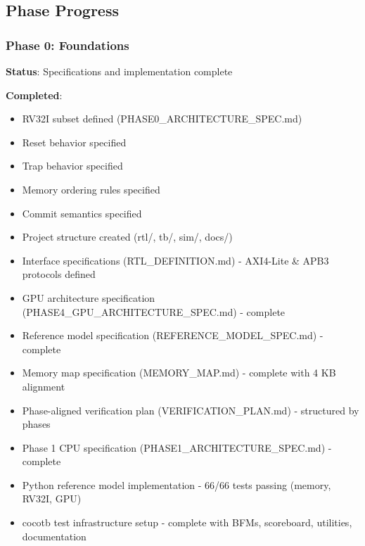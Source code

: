 \subsection{Phase Progress}\label{cr:status:phase-status:phase-progress}

\subsubsection{\texorpdfstring{Phase 0: Foundations
\ok{}}{Phase 0: Foundations }}\label{cr:status:phase-status:phase-0-foundations-white-check-mark}

\begin{record}

\textbf{Status}: Specifications and implementation complete

\textbf{Completed}:

\begin{itemize}
\tightlist
\item
  \ok{} RV32I subset defined
  (PHASE0\_\allowbreak{}ARCHITECTURE\_\allowbreak{}SPEC.md)
\item
  \ok{} Reset behavior specified
\item
  \ok{} Trap behavior specified
\item
  \ok{} Memory ordering rules specified
\item
  \ok{} Commit semantics specified
\item
  \ok{} Project structure created (rtl/, tb/, sim/, docs/)
\item
  \ok{} Interface specifications (RTL\_\allowbreak{}DEFINITION.md) -
  AXI4-Lite \& APB3 protocols defined
\item
  \ok{} GPU architecture specification
  (PHASE4\_\allowbreak{}GPU\_\allowbreak{}ARCHITECTURE\_\allowbreak{}SPEC.md)
  - complete
\item
  \ok{} Reference model specification
  (REFERENCE\_\allowbreak{}MODEL\_\allowbreak{}SPEC.md) - complete
\item
  \ok{} Memory map specification (MEMORY\_\allowbreak{}MAP.md) -
  complete with 4 KB alignment
\item
  \ok{} Phase-aligned verification plan
  (VERIFICATION\_\allowbreak{}PLAN.md) - structured by phases
\item
  \ok{} Phase 1 CPU specification
  (PHASE1\_\allowbreak{}ARCHITECTURE\_\allowbreak{}SPEC.md) - complete
\item
  \ok{} Python reference model implementation - 66/66 tests passing
  (memory, RV32I, GPU)
\item
  \ok{} cocotb test infrastructure setup - complete with BFMs,
  scoreboard, utilities, documentation
\end{itemize}


\end{record}
